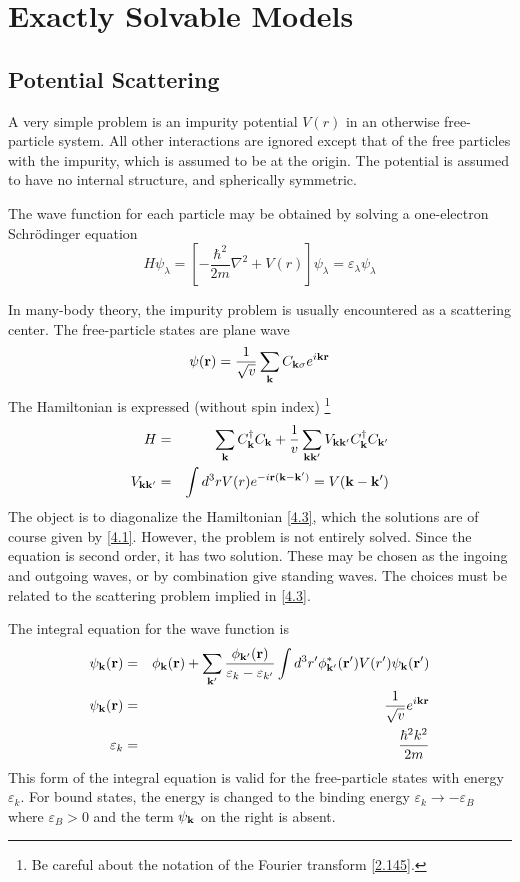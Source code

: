 \chapter{Exactly Solvable Models}

\section{Potential Scattering} \label{s4.1}
A very simple problem is an impurity potential $V(r)$ in an otherwise free-particle system.
All other interactions are ignored except that of the free particles with the impurity, which is assumed to be at the origin.
The potential is assumed to have no internal structure, and spherically symmetric.

The wave function for each particle may be obtained by solving a one-electron Schr{\"o}dinger equation
\begin{equation}
    H \psi_\lambda = \left[ - \frac{\hbar^2}{2m} \nabla^2 + V(r) \right] \psi_\lambda = \varepsilon_\lambda \psi_\lambda     \label{4.1}
\end{equation}

In many-body theory, the impurity problem is usually encountered as a scattering center.
The free-particle states are plane wave
\begin{equation}
    \psi(\mathbf{r}) = \frac{1}{\sqrt{v}} \sum_{\mathbf{k}} C_{\mathbf{k}\sigma} e^{i\mathbf{k} \mathbf{r}}      \label{4.2}
\end{equation}
The Hamiltonian is expressed (without spin index) \footnote{Be careful about the notation of the Fourier transform \eqref{2.145}.}
\begin{eqnarray}
    H &=& \sum_{\mathbf{k}} C_{\mathbf{k}}^\dagger C_{\mathbf{k}} + \frac{1}{v} \sum_{\mathbf{k}\mathbf{k}'} V_{\mathbf{k}\mathbf{k}'} C^\dagger_{\mathbf{k}} C_{\mathbf{k}'}  \label{4.3} \\
    V_{\mathbf{k}\mathbf{k}'} &=& \int d^3 r V(r) e^{-i\mathbf{r}(\mathbf{k}-\mathbf{k}')} = V(\mathbf{k}-\mathbf{k}')   \label{4.4}
\end{eqnarray}
The object is to diagonalize the Hamiltonian \eqref{4.3}, which the solutions are of course given by \eqref{4.1}.
However, the problem is not entirely solved.
Since the equation is second order, it has two solution.
These may be chosen as the ingoing and outgoing waves, or by combination give standing waves.
The choices must be related to the scattering problem implied in \eqref{4.3}.

The integral equation for the wave function is
\begin{eqnarray}
    \psi_{\mathbf{k}}(\mathbf{r}) &=& \phi_{\mathbf{k}}(\mathbf{r}) + \sum_{\mathbf{k}'} \frac{\phi_{\mathbf{k}'}(\mathbf{r})}{\varepsilon_k - \varepsilon_{k'}} \int d^3r' \phi^*_{\mathbf{k}'}(\mathbf{r}') V(r') \psi_{\mathbf{k}}(\mathbf{r}') \label{4.5} \\
    \psi_{\mathbf{k}} (\mathbf{r}) &=& \frac{1}{\sqrt{v}} e^{i \mathbf{k} \mathbf{r}} \label{4.6} \\
\varepsilon_k &=& \frac{\hbar^2 k^2  }{2m}  \label{4.7}
\end{eqnarray}
This form of the integral equation is valid for the free-particle states with energy $\varepsilon_k$.
For bound states, the energy is changed to the binding energy $\varepsilon_k \to -\varepsilon_B$ where $\varepsilon_B >0$ and the term $\psi_{\mathbf{k}}$ on the right is absent.

